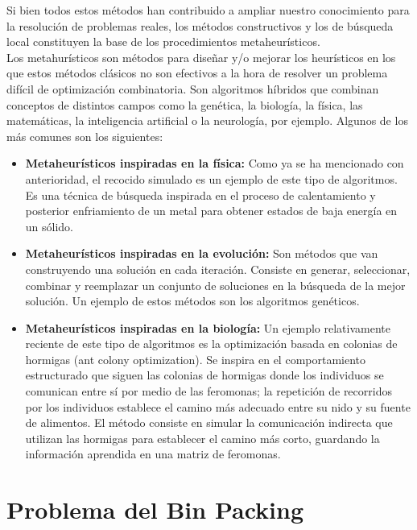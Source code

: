 \documentclass[a4paper, 12pt, oneside]{book}
\begin{document}
	Si bien todos estos m\'etodos han contribuido a ampliar nuestro conocimiento para la resoluci\'on de problemas reales, los m\'etodos constructivos y los de b\'usqueda local constituyen la base de los procedimientos metaheur\'isticos.
	\\
	
	Los metahur\'isticos son m\'etodos para dise\~{n}ar y/o mejorar los heur\'isticos en los que estos m\'etodos cl\'asicos no son efectivos a la hora de resolver un problema dif\'icil de optimizaci\'on combinatoria. Son algoritmos h\'ibridos que combinan conceptos de distintos campos como la gen\'etica, la biolog\'ia, la f\'isica, las matem\'aticas, la inteligencia artificial o la neurolog\'ia, por ejemplo. Algunos de los m\'as comunes son los siguientes:
	
	\begin{itemize}
		\item \textbf{Metaheur\'isticos inspiradas en la f\'isica:} Como ya se ha mencionado con anterioridad, el recocido simulado  es un ejemplo de este tipo de algoritmos. Es una t\'ecnica de b\'usqueda inspirada en el proceso de calentamiento y posterior enfriamiento de un metal para obtener estados de baja energ\'ia en un s\'olido. 
		\item \textbf{Metaheur\'isticos inspiradas en la evoluci\'on:} Son m\'etodos que van construyendo una soluci\'on en cada iteraci\'on. Consiste en generar, seleccionar, combinar y reemplazar un conjunto de soluciones en la b\'usqueda de la mejor soluci\'on. Un ejemplo de estos m\'etodos son los algoritmos gen\'eticos. 
		\item \textbf{Metaheur\'isticos inspiradas en la biolog\'ia:} Un ejemplo relativamente reciente de este tipo de algoritmos es la optimizaci\'on basada en colonias de hormigas (ant colony optimization). Se inspira en el comportamiento estructurado que siguen las colonias de hormigas donde los individuos se comunican entre s\'i por medio de las feromonas; la repetici\'on de recorridos por los individuos establece el camino m\'as adecuado entre su nido y su fuente de alimentos. El m\'etodo consiste en simular la comunicaci\'on indirecta que utilizan las hormigas para establecer el camino m\'as corto, guardando la informaci\'on aprendida en una matriz de feromonas.
	\end{itemize}
	
	
	
	
	\chapter{Problema del Bin Packing}
	
\end{document}
